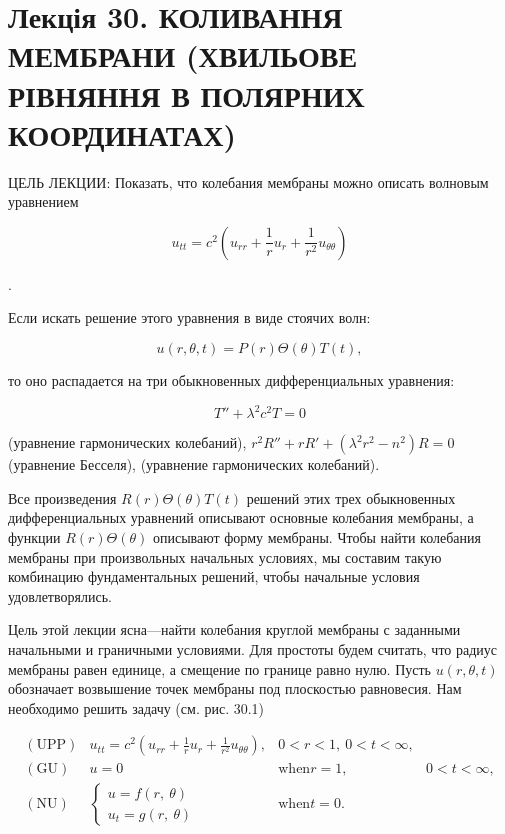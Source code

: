 \documentclass[
  ukrainian,
]{article}
\begin{document}
\section{Лекція 30. КОЛИВАННЯ МЕМБРАНИ (ХВИЛЬОВЕ РІВНЯННЯ В ПОЛЯРНИХ
КООРДИНАТАХ)}\label{ux43bux435ux43aux446ux456ux44f-30.-ux43aux43eux43bux438ux432ux430ux43dux43dux44f-ux43cux435ux43cux431ux440ux430ux43dux438-ux445ux432ux438ux43bux44cux43eux432ux435-ux440ux456ux432ux43dux44fux43dux43dux44f-ux432-ux43fux43eux43bux44fux440ux43dux438ux445-ux43aux43eux43eux440ux434ux438ux43dux430ux442ux430ux445}

ЦЕЛЬ ЛЕКЦИИ: Показать, что колебания мембраны можно описать волновым
уравнением

\[
u_{tt} = c^2 \left( u_{rr} + \frac{1}{r} u_r + \frac{1}{r^2} u_{\theta\theta} \right)
\]

.

Если искать решение этого уравнения в виде стоячих волн:

\[
u(r, \theta, t) = P(r) \Theta(\theta) T(t),
\]

то оно распадается на три обыкновенных дифференциальных уравнения:

\[
T'' + \lambda^2 c^2 T = 0
\]

(уравнение гармонических колебаний),
\(r^2 R'' + rR' + (\lambda^2 r^2 - n^2) R = 0\) (уравнение Бесселя),
(уравнение гармонических колебаний).

Все произведения \(R(r) \Theta(\theta) T(t)\) решений этих трех
обыкновенных дифференциальных уравнений описывают основные колебания
мембраны, а функции \(R(r) \Theta(\theta)\) описывают форму мембраны.
Чтобы найти колебания мембраны при произвольных начальных условиях, мы
составим такую комбинацию фундаментальных решений, чтобы начальные
условия удовлетворялись.

Цель этой лекции ясна---найти колебания круглой мембраны с заданными
начальными и граничными условиями. Для простоты будем считать, что
радиус мембраны равен единице, а смещение по границе равно нулю. Пусть
\(u\left(r,\theta,t\right)\) обозначает возвышение точек мембраны под
плоскостью равновесия. Нам необходимо решить задачу (см. рис. 30.1)

\[
\begin{array}{llll} (\text{UPP}) & u_{tt} = c^2 \left( u_{rr} + \frac{1}{r} u_r + \frac{1}{r^2} u_{\theta\theta} \right), & 0 < r < 1, \ 0 <t < \infty, \\ (\text{GU}) & u = 0 & \text{when} r = 1, & 0 < t < \infty, \\ (\text{NU}) & \begin{cases} u = f(r, \ \theta) \\ u_t = g(r, \ \theta) \end{cases} & \text{when} t = 0. \end{array}
\]
\end{document}
